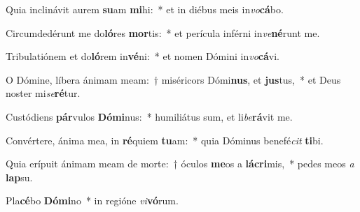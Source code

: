 \item Quia inclinávit aurem \textbf{su}am \textbf{mi}hi:~* et in diébus meis in\textit{vo}\textbf{cá}bo.
\item Circumdedérunt me do\textbf{ló}res \textbf{mor}tis:~* et perícula inférni in\textit{ve}\textbf{né}runt me.
\item Tribulatiónem et do\textbf{ló}rem in\textbf{vé}ni:~* et nomen Dómini in\textit{vo}\textbf{cá}vi.
\item O Dómine, líbera ánimam meam:~† miséricors Dómi\textbf{nus}, et \textbf{jus}tus,~* et Deus noster mi\textit{se}\textbf{ré}tur.
\item Custódiens \textbf{pár}vulos \textbf{Dó}\textbf{mi}nus:~* humiliátus sum, et li\textit{be}\textbf{rá}vit me.
\item Convértere, ánima mea, in \textbf{ré}quiem \textbf{tu}am:~* quia Dóminus benefé\textit{cit} \textbf{ti}bi.
\item Quia erípuit ánimam meam de morte:~† óculos \textbf{me}os a \textbf{lá}\textbf{cri}mis,~* pedes meos \textit{a} \textbf{lap}su.
\item Pla\textbf{cé}bo \textbf{Dó}\textbf{mi}no~* in regióne \textit{vi}\textbf{vó}rum.
